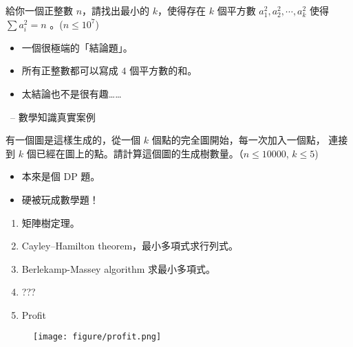 \documentclass[standalone]{beamer}
\begin{document}
\begin{frame}{}
  \begin{problem}
    給你一個正整數 $n$，請找出最小的 $k$，使得存在 $k$ 個平方數 $a_1^2, a_2^2, \cdots, a_k^2$
    使得 $\sum a_i^2 = n$ 。($n \leq 10^7$)
  \end{problem}

  \begin{itemize}
    \item<2-> 一個很極端的「結論題」。
    \item<3-> 所有正整數都可以寫成 $4$ 個平方數的和。
    \item<4-> 太結論也不是很有趣……
  \end{itemize}
\end{frame}

\begin{frame}{\secname \ -- 數學知識真實案例}
  \begin{problem}
    有一個圖是這樣生成的，從一個 $k$ 個點的完全圖開始，每一次加入一個點，
    連接到 $k$ 個已經在圖上的點。請計算這個圖的生成樹數量。（$n \leq 10000$, $k \leq 5$)
  \end{problem}
  \pause

  \begin{itemize}[<+->]
    \item 本來是個 DP 題。
    \item 硬被玩成數學題！
  \end{itemize}
\end{frame}

\begin{frame}{}
  \pause
  \begin{enumerate}[<+->]
    \item 矩陣樹定理。
    \item Cayley–Hamilton theorem，最小多項式求行列式。
    \item Berlekamp-Massey algorithm 求最小多項式。
    \item ???
    \item Profit
  \end{enumerate}

  \onslide<+->
  \begin{figure}
    \texttt{[image: figure/profit.png]}
  \end{figure}
\end{frame}
\end{document}
